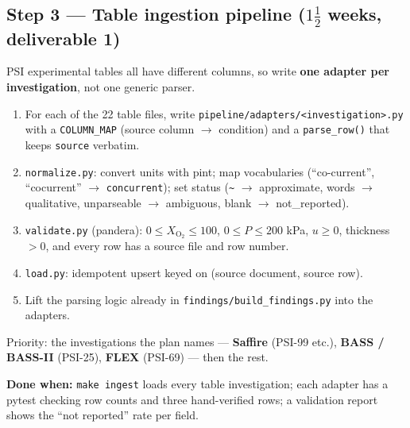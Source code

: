 \documentclass[11pt,a4paper]{article}
\newcommand{\code}[1]{\texttt{#1}}
\newcommand{\done}[1]{\begin{donebox}\textbf{Done when:} #1\end{donebox}}
\begin{document}
\subsection{Step 3 --- Table ingestion pipeline \hfill\normalfont\small ($1\tfrac{1}{2}$ weeks, deliverable 1)}
PSI experimental tables all have different columns, so write \textbf{one adapter per investigation}, not one generic parser.
\begin{enumerate}
  \item For each of the 22 table files, write \code{pipeline/adapters/<investigation>.py} with a \code{COLUMN\_MAP} (source column $\rightarrow$ condition) and a \code{parse\_row()} that keeps \code{source} verbatim.
  \item \code{normalize.py}: convert units with pint; map vocabularies (``co-current'', ``cocurrent'' $\rightarrow$ \code{concurrent}); set status (\code{\textasciitilde} $\rightarrow$ approximate, words $\rightarrow$ qualitative, unparseable $\rightarrow$ ambiguous, blank $\rightarrow$ not\_reported).
  \item \code{validate.py} (pandera): $0 \le X_{\mathrm{O_2}} \le 100$, $0 \le P \le 200$ kPa, $u \ge 0$, thickness $>0$, and every row has a source file and row number.
  \item \code{load.py}: idempotent upsert keyed on (source document, source row).
  \item Lift the parsing logic already in \code{findings/build\_findings.py} into the adapters.
\end{enumerate}
Priority: the investigations the plan names --- \textbf{Saffire} (PSI-99 etc.), \textbf{BASS / BASS-II} (PSI-25), \textbf{FLEX} (PSI-69) --- then the rest.
\done{\code{make ingest} loads every table investigation; each adapter has a pytest checking row counts and three hand-verified rows; a validation report shows the ``not reported'' rate per field.}
\end{document}
